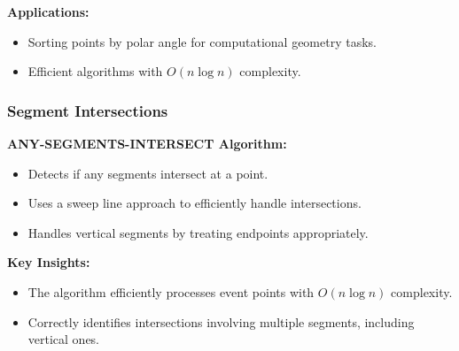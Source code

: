 \textbf{Applications:}
\begin{itemize}[noitemsep]
    \item Sorting points by polar angle for computational geometry tasks.
    \item Efficient algorithms with $O(n \log n)$ complexity.
\end{itemize}

\subsubsection{Segment Intersections}
\textbf{ANY-SEGMENTS-INTERSECT Algorithm:}
\begin{itemize}[noitemsep]
    \item Detects if any segments intersect at a point.
    \item Uses a sweep line approach to efficiently handle intersections.
    \item Handles vertical segments by treating endpoints appropriately.
\end{itemize}

\textbf{Key Insights:}
\begin{itemize}[noitemsep]
    \item The algorithm efficiently processes event points with $O(n \log n)$ complexity.
    \item Correctly identifies intersections involving multiple segments, including vertical ones.
\end{itemize}
